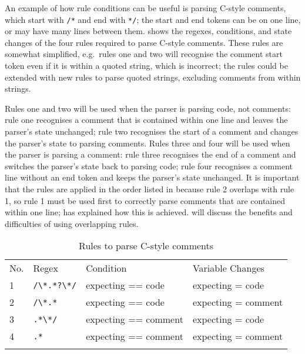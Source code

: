 An example of how rule conditions can be useful is parsing C-style
comments, which start with \texttt{/*} and end with \texttt{*/}; the start
and end tokens can be on one line, or may have many lines between them.
 shows the regexes, conditions,
and state changes of the four rules required to parse C-style comments.
These rules are somewhat simplified, e.g.\ rules one and two will recognise
the comment start token even if it is within a quoted string, which is
incorrect; the rules could be extended with new rules to parse quoted
strings, excluding comments from within strings.

Rules one and two will be used when the parser is parsing code, not
comments: rule one recognises a comment that is contained within one line
and leaves the parser's state unchanged; rule two recognises the start of a
comment and changes the parser's state to parsing comments.  Rules three
and four will be used when the parser is parsing a comment: rule three
recognises the end of a comment and switches the parser's state back to
parsing code; rule four recognises a comment line without an end token and
keeps the parser's state unchanged.  It is important that the rules are
applied in the order listed in 
because rule 2 overlaps with rule 1, so rule 1 must be used first to
correctly parse comments that are contained within one line;
 has explained how this is achieved.
 will discuss the benefits
and difficulties of using overlapping rules.

\begin{table}[thbp]
    \caption{Rules to parse C-style comments}
    \empty{}\label{Rules to parse C-style comments}
    \begin{tabular}{llll}
        \tabletopline{}%
        No.   & Regex             & Condition             & Variable Changes    \\
        \tablemiddleline{}%
        1     & \verb!/\*.*?\*/!  & expecting == code     & expecting = code      \\
        2     & \verb!/\*.*!      & expecting == code     & expecting = comment   \\
        3     & \verb!.*\*/!      & expecting == comment  & expecting = code      \\
        4     & \verb!.*!         & expecting == comment  & expecting = comment   \\
        \tablebottomline{}%
    \end{tabular}
\end{table}

